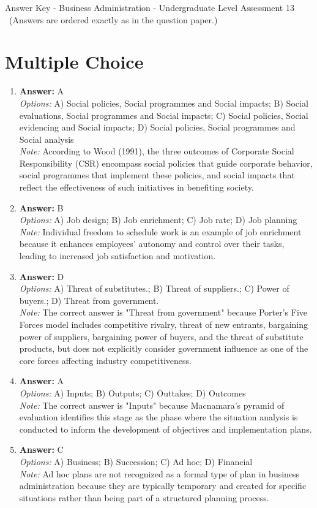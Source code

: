 \documentclass[12pt]{article}
\begin{document}
\begin{center}
Answer Key - Business Administration - Undergraduate Level Assessment 13 \
\small (Answers are ordered exactly as in the question paper.)
\end{center}

\section*{Multiple Choice}
\begin{enumerate}[label=\arabic*.]
\item \textbf{Answer:} A
\\ \textit{Options:} A) Social policies, Social programmes and Social impacts; B) Social evaluations, Social programmes and Social impacts; C) Social policies, Social evidencing and Social impacts; D) Social policies, Social programmes and Social analysis
\\ \textit{Note:} According to Wood (1991), the three outcomes of Corporate Social Responsibility (CSR) encompass social policies that guide corporate behavior, social programmes that implement these policies, and social impacts that reflect the effectiveness of such initiatives in benefiting society.
\item \textbf{Answer:} B
\\ \textit{Options:} A) Job design; B) Job enrichment; C) Job rate; D) Job planning
\\ \textit{Note:} Individual freedom to schedule work is an example of job enrichment because it enhances employees' autonomy and control over their tasks, leading to increased job satisfaction and motivation.
\item \textbf{Answer:} D
\\ \textit{Options:} A) Threat of substitutes.; B) Threat of suppliers.; C) Power of buyers.; D) Threat from government.
\\ \textit{Note:} The correct answer is "Threat from government" because Porter's Five Forces model includes competitive rivalry, threat of new entrants, bargaining power of suppliers, bargaining power of buyers, and the threat of substitute products, but does not explicitly consider government influence as one of the core forces affecting industry competitiveness.
\item \textbf{Answer:} A
\\ \textit{Options:} A) Inputs; B) Outputs; C) Outtakes; D) Outcomes
\\ \textit{Note:} The correct answer is "Inputs" because Macnamara's pyramid of evaluation identifies this stage as the phase where the situation analysis is conducted to inform the development of objectives and implementation plans.
\item \textbf{Answer:} C
\\ \textit{Options:} A) Business; B) Succession; C) Ad hoc; D) Financial
\\ \textit{Note:} Ad hoc plans are not recognized as a formal type of plan in business administration because they are typically temporary and created for specific situations rather than being part of a structured planning process.
\end{enumerate}
\end{document}
